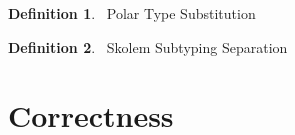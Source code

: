 \documentclass[acmsmall]{acmart}
\theoremstyle{definition}
\newtheorem{definition}{Definition}[section]
\begin{document}
\begin{definition}\boxed{\tau[\alpha\slash\tau]^\pm = \tau}\ Polar Type Substitution 
  \label{def:polar_type_substitution}
  \begin{mathpar}
  \end{mathpar}
\end{definition}

\begin{definition}\ Skolem Subtyping Separation 
  \label{def:skolem}
  \begin{mathpar}
  \end{mathpar}
\end{definition}






\section{Correctness}
\label{sect:correctness}

\end{document}
